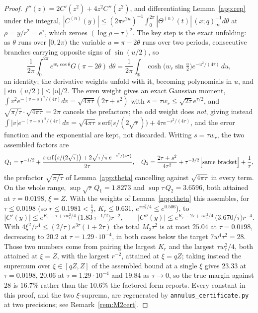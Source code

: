 \documentclass[11pt]{article}
\theoremstyle{plain}
\theoremstyle{definition}
\theoremstyle{remark}
\newcommand{\R}{\mathbb{R}}
\begin{document}
\begin{proof}
$f''(z)=2C'(z^2)+4z^2C''(z^2)$, and differentiating Lemma~\ref{app:rep} under the integral,
$|C^{(n)}(y)|\le(2\pi r^{2n})^{-1}\int_0^{2\pi}|\Theta^{(n)}(t)|\,(x;q)_\infty^{-1}d\theta$ at
$\rho=y/r^2=e^\tau$, which zeroes $(\log\rho-\tau)^2$. The key step is the exact unfolding: as
$\theta$ runs over $[0,2\pi)$ the variable $u=\pi-2\theta$ runs over two periods, consecutive
branches carrying opposite signs of $\sin(u/2)$, so
\[
 \frac1{2\pi}\int_0^{2\pi}e^{w_r\cos\theta}G(\pi-2\theta)\,d\theta
 =\frac1{2\pi}\int_{\R}\cosh\bigl(w_r\sin\tfrac u2\bigr)e^{-u^2/(4\tau)}\,du ,
\]
an identity; the derivative weights unfold with it, becoming polynomials in $u$, and
$|\sin(u/2)|\le|u|/2$. The even weight gives an exact Gaussian moment,
$\int v^2e^{-(v-s)^2/(4\tau)}dv=\sqrt{4\pi\tau}(2\tau+s^2)$ with $s=\tau w_r\le\sqrt{2\tau}e^{\tau/2}$,
and $\sqrt{\pi/\tau}\cdot\sqrt{4\pi\tau}=2\pi$ cancels the prefactors; the odd weight does
\emph{not}, giving instead
$\int|v|e^{-(v-s)^2/(4\tau)}dv=\sqrt{4\pi\tau}\,s\,\mathrm{erf}\bigl(s/(2\sqrt\tau)\bigr)
+4\tau e^{-s^2/(4\tau)}$, and the error function and the exponential are kept, not discarded.
Writing $s=\tau w_r$, the two assembled factors are
\[
 Q_1=\tau^{-1/2}+\frac{s\,\mathrm{erf}\bigl(s/(2\sqrt\tau)\bigr)+2\sqrt{\tau/\pi}\,e^{-s^2/(4\tau)}}{2\tau},
 \quad
 Q_2=\frac{2\tau+s^2}{4\tau^2}+\tau^{-3/2}\Bigl[\text{same bracket}\Bigr]+\frac1\tau ,
\]
the prefactor $\sqrt{\pi/\tau}$ of Lemma~\ref{app:theta} cancelling against $\sqrt{4\pi\tau}$ in
every term. On the whole range, $\sup\sqrt\tau\,Q_1=1.8273$ and $\sup\tau\,Q_2=3.6596$, both
attained at $\tau=0.0198$, $\xi=Z$. With the weights of
Lemma~\ref{app:theta} this assembles, for $\tau\le0.0198$ (so $r\le0.1981<\tfrac12$, $K_r\le0.631$,
$e^{\tau w_r^2/4}\le e^{0.506}$), to
\[
 |C'(y)|\le e^{K_r-\tau+\tau w_r^2/4}\,\bigl(1.83\,\tau^{-1/2}\bigr)r^{-2},\qquad
 |C''(y)|\le e^{K_r-2\tau+\tau w_r^2/4}\,\bigl(3.670/\tau\bigr)r^{-4}.
\]
With $4\xi^2/r^4\le(2/\tau)e^{3\tau}(1+2\tau)$ the total $M_2\tau^2$ is at most $25.04$ at
$\tau=0.0198$, decreasing to $20.2$ at $\tau=1.29\cdot10^{-4}$, in both cases below the target
$7w^4\tau^2=28$. Those two numbers come from pairing the largest $K_r$ and the largest
$\tau w_r^2/4$, both attained at $\xi=Z$, with the largest $r^{-2}$, attained at $\xi=qZ$; taking
instead the supremum over $\xi\in[qZ,Z]$ of the assembled bound at a single $\xi$ gives $23.33$ at
$\tau=0.0198$, $20.06$ at $\tau=1.29\cdot10^{-4}$ and $19.84$ as $\tau\to0$, so the true margin
against $28$ is $16.7\%$ rather than the $10.6\%$ the factored form reports. Every constant in this
proof, and the two $\xi$-suprema, are regenerated by \texttt{annulus\_certificate.py} at two
precisions; see Remark~\ref{rem:M2cert}.
\end{proof}
\end{document}
